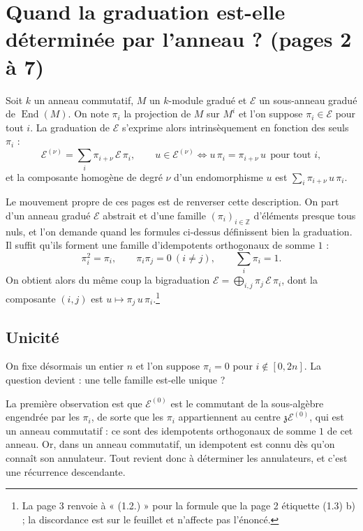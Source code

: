 \documentclass[11pt,a4paper]{article}
\begin{document}
\section*{Quand la graduation est-elle déterminée par l'anneau ? (pages 2 à 7)}

Soit $k$ un anneau commutatif, $M$ un $k$-module gradué et $\mathcal{E}$ un
sous-anneau gradué de $\operatorname{End}(M)$. On note $\pi_{i}$ la projection
de $M$ sur $M^{i}$ et l'on suppose $\pi_{i} \in \mathcal{E}$ pour tout $i$.
La graduation de $\mathcal{E}$ s'exprime alors intrinsèquement en fonction des
seuls $\pi_{i}$ :
\[
\mathcal{E}^{(\nu)} = \sum_{i} \pi_{i+\nu}\, \mathcal{E}\, \pi_{i},
\qquad
u \in \mathcal{E}^{(\nu)} \iff u\,\pi_{i} = \pi_{i+\nu}\,u \ \ \text{pour tout } i,
\]
et la composante homogène de degré $\nu$ d'un endomorphisme $u$ est
$\sum_{i} \pi_{i+\nu}\,u\,\pi_{i}$.

Le mouvement propre de ces pages est de renverser cette description. On part
d'un anneau gradué $\mathcal{E}$ abstrait et d'une famille $(\pi_{i})_{i \in
\mathbb{Z}}$ d'éléments presque tous nuls, et l'on demande quand les formules
ci-dessus définissent bien la graduation. Il suffit qu'ils forment une famille
d'idempotents orthogonaux de somme $1$ :
\[
\pi_{i}^{2} = \pi_{i}, \qquad \pi_{i}\pi_{j} = 0 \ (i \neq j),
\qquad \sum_{i} \pi_{i} = 1 .
\]
On obtient alors du même coup la bigraduation
$\mathcal{E} = \bigoplus_{i,j} \pi_{j}\,\mathcal{E}\,\pi_{i}$, dont la
composante $(i,j)$ est $u \mapsto \pi_{j}\,u\,\pi_{i}$.\footnote{La page 3
renvoie à « (1.2.) » pour la formule que la page 2 étiquette (1.3) b) ; la
discordance est sur le feuillet et n'affecte pas l'énoncé.}

\subsection*{Unicité}

On fixe désormais un entier $n$ et l'on suppose $\pi_{i} = 0$ pour
$i \notin [0, 2n]$. La question devient : une telle famille est-elle unique ?

La première observation est que $\mathcal{E}^{(0)}$ est le commutant de la
sous-algèbre engendrée par les $\pi_{i}$, de sorte que les $\pi_{i}$
appartiennent au centre $\mathfrak{z}\mathcal{E}^{(0)}$, qui est un anneau
commutatif : ce sont des idempotents orthogonaux de somme $1$ de cet anneau.
Or, dans un anneau commutatif, un idempotent est connu dès qu'on connaît son
annulateur. Tout revient donc à déterminer les annulateurs, et c'est une
récurrence descendante.
\end{document}
